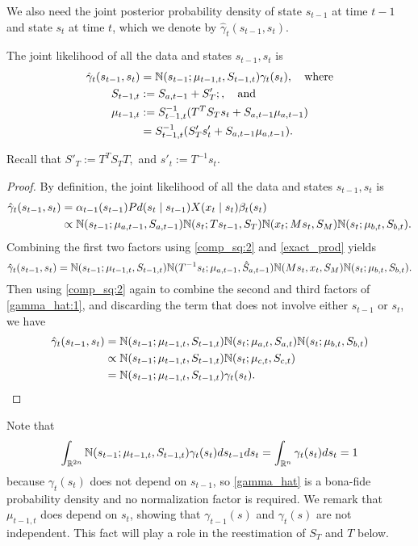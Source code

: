 \documentclass[12pt,leqno]{article}
\begin{document}
We also need the joint posterior probability density of state $s_{t-1}$ at time $t-1$ and state $s_t$ at time $t$,
which we denote by $\hat{\gamma}_t(s_{t-1},s_t)$.
\begin{Lem}\label{gamma_hat}
The joint likelihood of all the data and states $s_{t-1},s_t$ is
\begin{align*}
  \hat{\gamma}_t(s_{t-1},s_t) &= {\mathbb N}(s_{t-1};\mu_{t-1,t},S_{t-1,t})\gamma_t(s_t), \quad\text{where} \\
  S_{t-1,t} &:= S_{a,t-1}+S_T';,\quad\text{and}\\
  \mu_{t-1,t} &:= S_{t-1,t}^{-1}(T^TS_Ts_t + S_{a,t-1}\mu_{a,t-1})\\
  &= S_{t-1,t}^{-1}(S'_Ts'_t + S_{a,t-1}\mu_{a,t-1}).\\
\end{align*}
\end{Lem}
Recall that $S'_T := T^TS_TT,$ and $s'_t := T^{-1}s_t$.
\begin{proof}
  By definition, the joint likelihood of all the data and states $s_{t-1},s_t$ is 
  \begin{align*}
    \hat{\gamma}_t(s_{t-1},s_t) &= \alpha_{t-1}(s_{t-1})Pd(s_t\mid s_{t-1})X(x_t\mid s_t)\beta_t(s_t) \\
    &\propto {\mathbb N}(s_{t-1};\mu_{a,t-1},S_{a,t-1}){\mathbb N}(s_t;Ts_{t-1},S_T){\mathbb N}(x_t;Ms_t,S_M){\mathbb N}(s_t;\mu_{b,t},S_{b,t}).
  \end{align*}
  Combining the first two factors using \eqref{comp_sq:2} and \eqref{exact_prod} yields
  \begin{equation}\label{gamma_hat:1}
    \hat{\gamma}_t(s_{t-1},s_t) = {\mathbb N}(s_{t-1};\mu_{t-1,t},S_{t-1,t}){\mathbb N}(T^{-1}s_t;\mu_{a,t-1},\hat{S}_{a,t-1}){\mathbb N}(Ms_t,x_t,S_M){\mathbb N}(s_t;\mu_{b,t},S_{b,t}).
  \end{equation}
  Then using \eqref{comp_sq:2} again to combine the second and third factors of \eqref{gamma_hat:1}, and discarding
  the term that does not involve either $s_{t-1}$ or $s_t$, we have
    \begin{align*}
      \hat{\gamma}_t(s_{t-1},s_t) &= {\mathbb N}(s_{t-1};\mu_{t-1,t},S_{t-1,t}){\mathbb N}(s_t;\mu_{a,t},S_{a,t}){\mathbb N}(s_t;\mu_{b,t},S_{b,t})\\
      &\propto {\mathbb N}(s_{t-1};\mu_{t-1,t},S_{t-1,t}){\mathbb N}(s_t;\mu_{c,t},S_{c,t})\\ 
      &= {\mathbb N}(s_{t-1};\mu_{t-1,t},S_{t-1,t})\gamma_t(s_t).
    \end{align*}
\end{proof}
  Note that
  $$
  \int_{{\mathbb R}^{2n}}{\mathbb N}(s_{t-1};\mu_{t-1,t},S_{t-1,t})\gamma_t(s_t)ds_{t-1}ds_t = \int_{{\mathbb R}^n}\gamma_t(s_t)ds_t = 1 
  $$
  because $\gamma_t(s_t)$ does not depend on $s_{t-1}$, so \eqref{gamma_hat} is a bona-fide probability density and no
  normalization factor is required.  We remark that $\mu_{t-1,t}$ does depend on $s_t$, showing that $\gamma_{t-1}(s)$
  and $\gamma_t(s)$ are not independent.  This fact will play a role in the reestimation of $S_T$ and $T$ below.
  
\end{document}
